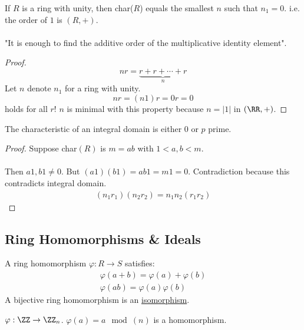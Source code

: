 \documentclass[class=scrartcl, crop=false]{standalone}
\begin{document}
\begin{lemma}
  If $R$ is a ring with unity, then char($R$) equals the smallest  $n$ such that $n_1 = 0$. i.e. the order of $1$ is $(R, +)$.
  \\\\
  "It is enough to find the additive order of the multiplicative identity element".
  \begin{proof}
    \[nr = \underbrace{r + r + \cdots + r}_{n}\]
    Let $n$ denote $n_1$ for a ring with unity.
    \[
      nr = (n 1)r = 0r = 0
    \] holds for all $r$! $n$ is minimal with this property because $n = |1|$ in $(\RR, +)$.
  \end{proof} 
\end{lemma} 

\begin{theorem}
  The characteristic of an integral domain is either $0$ or $p$ prime.
  \begin{proof}
    Suppose char$(R)$ is $m = ab$ with $1 < a, b < m$.
    \\\\
    Then $a 1, b 1 \neq 0$. But $(a 1)(b 1) = ab 1 = m 1 = 0$. Contradiction because this contradicts integral domain.
    \begin{gather*}
      (n_1r_1)(n_2r_2) = n_1n_2(r_1r_2)
    \end{gather*} 
  \end{proof} 
\end{theorem} 

\subsection{Ring Homomorphisms \& Ideals}

A ring homomorphism $\varphi: R \to S$ satisfies:
\begin{gather*}
  \varphi(a + b) = \varphi(a) + \varphi(b) \\
  \varphi(ab) = \varphi(a)\varphi(b)
\end{gather*} 
A bijective ring homomorphism is an \ul{isomorphism}.
\begin{example}
  $\varphi:\ZZ \to \ZZ_n$.  $\varphi(a) = a \mod(n)$ is a homomorphism.
\end{example} 
\end{document}
